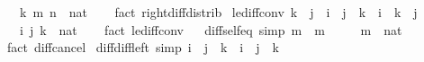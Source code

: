 \begin{isabellebody}
\ \ \ k\ m\ n\ {\isacharcolon}{\kern0pt}{\isacharcolon}{\kern0pt}\ nat\isanewline
%
\isadelimproof
\ \ %
\endisadelimproof
%
\isatagproof
{}\isamarkupfalse%
\ {\isacharparenleft}{\kern0pt}fact\ right{\isacharunderscore}{\kern0pt}diff{\isacharunderscore}{\kern0pt}distrib{\isacharprime}{\kern0pt}{\isacharparenright}{\kern0pt}%
\endisatagproof
{\isafoldproof}%
%
\isadelimproof
\isanewline
%
\endisadelimproof
\isanewline
\isanewline
{}\isamarkupfalse%
\ le{\isacharunderscore}{\kern0pt}diff{\isacharunderscore}{\kern0pt}conv{}{\isacharcolon}{\kern0pt}\ {\isachardoublequoteopen}k\ {\isasymle}\ j\ {\isasymLongrightarrow}\ {\isacharparenleft}{\kern0pt}i\ {\isasymle}\ j\ {\isacharminus}{\kern0pt}\ k{\isacharparenright}{\kern0pt}\ {\isacharequal}{\kern0pt}\ {\isacharparenleft}{\kern0pt}i\ {\isacharplus}{\kern0pt}\ k\ {\isasymle}\ j{\isacharparenright}{\kern0pt}{\isachardoublequoteclose}\isanewline
\ \ \ i\ j\ k\ {\isacharcolon}{\kern0pt}{\isacharcolon}{\kern0pt}\ nat\isanewline
%
\isadelimproof
\ \ %
\endisadelimproof
%
\isatagproof
{}\isamarkupfalse%
\ {\isacharparenleft}{\kern0pt}fact\ le{\isacharunderscore}{\kern0pt}diff{\isacharunderscore}{\kern0pt}conv{}{\isacharparenright}{\kern0pt}%
\endisatagproof
{\isafoldproof}%
%
\isadelimproof
\ \isanewline
%
\endisadelimproof
\isanewline
{}\isamarkupfalse%
\ diff{\isacharunderscore}{\kern0pt}self{\isacharunderscore}{\kern0pt}eq{\isacharunderscore}{\kern0pt}{}\ {\isacharbrackleft}{\kern0pt}simp{\isacharbrackright}{\kern0pt}{\isacharcolon}{\kern0pt}\ {\isachardoublequoteopen}m\ {\isacharminus}{\kern0pt}\ m\ {\isacharequal}{\kern0pt}\ {}{\isachardoublequoteclose}\isanewline
\ \ \ m\ {\isacharcolon}{\kern0pt}{\isacharcolon}{\kern0pt}\ nat\isanewline
%
\isadelimproof
\ \ %
\endisadelimproof
%
\isatagproof
{}\isamarkupfalse%
\ {\isacharparenleft}{\kern0pt}fact\ diff{\isacharunderscore}{\kern0pt}cancel{\isacharparenright}{\kern0pt}%
\endisatagproof
{\isafoldproof}%
%
\isadelimproof
\isanewline
%
\endisadelimproof
\isanewline
{}\isamarkupfalse%
\ diff{\isacharunderscore}{\kern0pt}diff{\isacharunderscore}{\kern0pt}left\ {\isacharbrackleft}{\kern0pt}simp{\isacharbrackright}{\kern0pt}{\isacharcolon}{\kern0pt}\ {\isachardoublequoteopen}i\ {\isacharminus}{\kern0pt}\ j\ {\isacharminus}{\kern0pt}\ k\ {\isacharequal}{\kern0pt}\ i\ {\isacharminus}{\kern0pt}\ {\isacharparenleft}{\kern0pt}j\ {\isacharplus}{\kern0pt}\ k{\isacharparenright}{\kern0pt}{\isachardoublequoteclose}\isanewline

\end{isabellebody}
